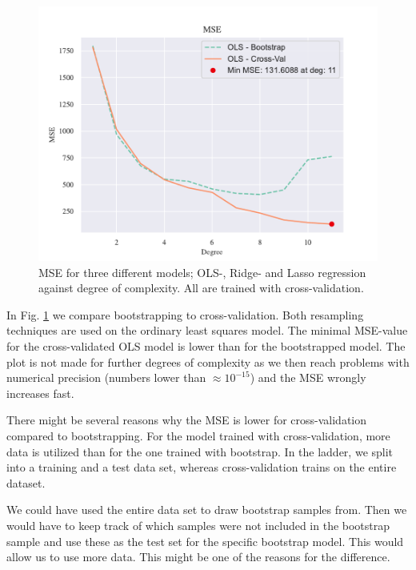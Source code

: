 \begin{figure}[h!]
    \centering
    \includegraphics[width=1\linewidth]{project_1_alt/figures/figures_in_report/CV_BS_OLS_Terrain.pdf}
    \caption{MSE for three different models; OLS-, Ridge- and Lasso regression against degree of complexity. All are trained with cross-validation.}
    \label{cv_versus_bs}
\end{figure}

In Fig. \ref{cv_versus_bs} we compare bootstrapping to cross-validation. Both resampling techniques are used on the ordinary least squares model. The minimal MSE-value for the cross-validated OLS model is lower than for the bootstrapped model. The plot is not made for further degrees of complexity as we then reach problems with numerical precision (numbers lower than $\approx 10^{-15}$) and the MSE wrongly increases fast.  

There might be several reasons why the MSE is lower for cross-validation compared to bootstrapping. For the model trained with cross-validation, more data is utilized than for the one trained with bootstrap. In the ladder, we split into a training and a test data set, whereas cross-validation trains on the entire dataset.

We could have used the entire data set to draw bootstrap samples from. Then we would have to keep track of which samples were not included in the bootstrap sample and use these as the test set for the specific bootstrap model. This would allow us to use more data. This might be one of the reasons for the difference. 



